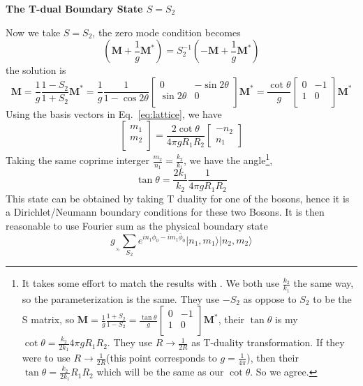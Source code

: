 \documentclass{article}
\renewcommand{\vec}[1]{\boldsymbol{\mathbf{#1}}}
\begin{document}
{\bf The T-dual Boundary State $S = S_2$}

Now we take $S = S_2$, the zero mode condition becomes
\begin{equation}
( \vec{M} + \frac{1}{g}\vec{M}^* ) =  S_2^{-1}  ( -\vec{M} + \frac{1}{g}\vec{M}^* )
\end{equation}
the solution is
\begin{equation}
\vec{M} =  \frac{1}{g} \frac{1 - S_2}{1 + S_2} \vec{M}^{*} = \frac{1}{g}  \frac{1}{ 1 - \cos 2\theta}
\begin{bmatrix}
  0 & - \sin 2 \theta \\
\sin 2\theta & 0 \\
\end{bmatrix} \vec{M}^*
 = \frac{\cot \theta}{g} \begin{bmatrix}
  0 & - 1 \\
1 & 0 \\
\end{bmatrix}\vec{M}^*
\end{equation}
Using the basis vectors in Eq.~\ref{eq:lattice}, we have
\begin{equation}
\begin{bmatrix}
m_1\\
m_2\\
\end{bmatrix}
 = \frac{2 \cot \theta}{ 4\pi g  R_1 R_2 }
\begin{bmatrix}
-n_2 \\
n_1 
\end{bmatrix}
\end{equation}
Taking the same coprime interger $\frac{m_2}{n_1} = \frac{k_2}{k_1}$, we have the angle\footnote{It takes some effort to match the results with \cite{bachas_fusion_2008}. We both use $\frac{k_2}{k_1}$ the same way, so the parameterization is the same. They use $-S_2$ as oppose to $S_2$ to be the S matrix, so $\vec{M} = \frac{1}{g} \frac{1 + S_2}{1 - S_2} = \frac{\tan \theta}{g}\begin{bmatrix}
  0 & - 1 \\
1 & 0 \\
\end{bmatrix} \vec{M}^*$, their $\tan \theta$ is my $\cot \theta = \frac{k_2}{2k_1 } 4\pi g R_1 R_2$. They use $R \rightarrow \frac{1}{2R}$ as T-duality transformation. If they were to use $R \rightarrow \frac{1}{2R}$(this point corresponds to $g = \frac{1}{4\pi}$), then their $\tan \theta = \frac{k_2}{2 k_1} R_1 R_2$ which will be the same as our $\cot \theta$. So we agree.},
\begin{equation}
  \tan \theta = \frac{2 k_1}{k_2} \frac{1}{4 \pi g R_1 R_2}
\end{equation}
This state can be obtained by taking T duality for one of the bosons, hence it is a Dirichlet/Neumann boundary conditions for these two Bosons. It is then reasonable to use Fourier sum as the physical boundary state
\begin{equation}
g_{_{\,\!_{S_2}}}\sum_{S_2} e^{i n_1 \phi_0 - i m_1 \bar{\phi}_0 } | n_1, m_1  \rangle | n_2, m_2  \rangle 
\end{equation}
\end{document}
